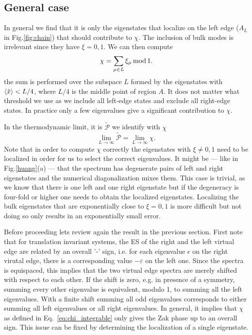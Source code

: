 \documentclass[twocolumn,amsmath,longbibliography,amssymb,superscriptaddress]{revtex4-1}
\begin{document}
\subsection{General case}

In general we find that it is only the eigenstates that localize on the left edge ($A_L$ in Fig.\ref{fig:chain}) that should contribute to $\chi$. The inclusion of bulk modes is irrelevant since they have $\xi = 0,1$. We can then compute
\begin{equation}
\chi = \sum_{\mu \in L} \xi_\mu \, {\rm mod} \, 1. 
\label{eq:chi_left}
\end{equation}
the sum is performed over the subspace $L$ formed by the eigenstates with $\expval{\hat{x}}<L/4$, where $L/4$ is the middle point of region $A$. It does not matter what threshold we use as we include all left-edge states and exclude all right-edge states. In practice only a few eigenvalues give a significant contribution to $\chi$. 


In the thermodynamic limit, it is $\tilde{\mathcal{P}}$ we identify with $\chi$
\begin{equation}
\lim_{L \rightarrow \infty} \tilde{\mathcal{P}} = \lim_{L \rightarrow \infty} \chi.
\label{eq:ptilde_eq_chi}
\end{equation}
Note that in order to compute $\chi$ correctly the eigenstates with $\xi \neq 0,1$ need to be localized in order for us to select the correct eigenvalues. It might be --- like in Fig.\ref{huang}(a) --- that the spectrum has degenerate pairs of left and right eigenstates and the numerical diagonalization mixes them. This case is trivial, as we know that there is one left and one right eigenstate but if the degeneracy is four-fold or higher one needs to obtain the localized eigenstates. Localizing the bulk eigenstates that are exponentially close to $\xi = 0,1$ is more difficult but not doing so only results in an exponentially small error. 

Before proceeding lets review again the result in the previous section. First note that for translation invariant systems, the ES of the right and the left virtual edge are related by an overall '-' sign, i.e. for each eigenvalue $\epsilon$ on the right virutal edge, there is a corresponding value $-\varepsilon$ on the left one. 
Since the spectra is equispaced, this implies that the two virtual edge spectra are merely shifted with respect to each other.
If the shift is zero, e.g.  in presence of a symmetry, summing every other eigenvalue is equivalent, modulo 1, to summing all the left eigenvalues. With a finite shift summing all odd eigenvalues corresponds to either summing all left eigenvalues or all right eigenvalues. In general, it implies that $\chi$ as defined in Eq.~\eqref{eq:chi_integrable} only gives the Zak phase up to an overall sign. This issue can be fixed by determining the localization of a single eigenstate. 
\end{document}
